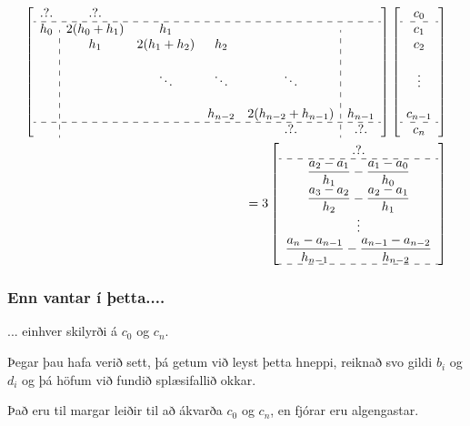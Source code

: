 \documentclass[icelandic,a4paper,12pt]{article}
\begin{document}
{\small
\begin{align*}
	\left[ \begin{array}{c:cccc:c}
	.?.  & .?.       &&&& \\ \hdashline
	h_0 & 2(h_0+h_1) & h_1 &&&\\
   		& h_1        & 2(h_1+h_2) & h_2 &&\\
    	&&&&&\\
    	&            & \ddots      & \ddots & \ddots &\\
    	&&&&&\\
    	&  &  & h_{n-2}  & 2(h_{n-2} + h_{n-1}) & h_{n-1} 
    	\\ \hdashline
    	&  &  &   & .?.    & .?.
	\end{array} \right]
	\left[ \begin{array}{c}
	c_0 \\ \hdashline
 	c_1 \\
 	c_2 \\
 	\\
 	\vdots \\
 	\\
 	c_{n-1} \\ \hdashline
 	c_n
	\end{array} \right] 
	\\
	= 3\left[ \begin{array}{c}
	.?. \\ \hdashline
	\dfrac{a_2-a_1}{h_1} - \dfrac{a_1-a_0}{h_0} \\
	\dfrac{a_3-a_2}{h_2} - \dfrac{a_2-a_1}{h_1} \\
	\vdots \\
	\dfrac{a_n-a_{n-1}}{h_{n-1}} 
		- \dfrac{a_{n-1}-a_{n-2}}{h_{n-2}}
	\\ \hdashline
	\end{array} \right]
\end{align*}
}
 

\subsubsection{Enn vantar í þetta....} 
... einhver skilyrði á $c_0$ og $c_n$. 

\pause
\smallskip
Þegar þau hafa verið sett, þá  getum við leyst þetta hneppi, reiknað svo
gildi $b_i$ og  $d_i$ og þá höfum við fundið splæsifallið okkar. 

\pause
\smallskip
Það eru til margar
leiðir til að ákvarða $c_0$ og $c_n$, en fjórar eru algengastar. 
\end{document}
